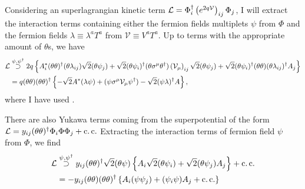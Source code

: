 \documentclass[../main.tex]{subfiles}
\begin{document}
Considering an superlagrangian kinetic term \(\mathcal{L} = \Phi^\dagger_i
\left(e^{2q \mathcal{V}}\right)_{ij} \Phi_j\), I will extract the interaction
terms containing either the fermion fields multiplets \(\psi\) from \(\Phi\)
and the fermion fields \(\lambda \equiv \lambda^a T^a\) from \(\mathcal{V}
\equiv V^a T^a\). Up to terms with the appropriate amount of \(\theta\)s, we
have
\begin{align}
    \label{susy:eq:psi_kin_int}
    \nonumber
    \mathcal{L} & \stackrel{\psi, \psi^\dagger}{\supset} 2q \left\{ A^\ast_i (\theta\theta)^\dagger (\theta\lambda_{ij}) \sqrt{2} (\theta\psi_j) + \sqrt{2} (\theta\psi_i)^\dagger (\theta\sigma^\mu\theta^\dagger) \left(\mathcal{V}_\mu\right)_{ij} \sqrt{2} (\theta\psi_j) + \sqrt{2} (\theta\psi_i)^\dagger (\theta\theta) (\theta\lambda_{ij})^\dagger A_j \right\} \\
       & = q(\theta\theta)(\theta\theta)^\dagger \left\{ -\sqrt{2} A^\ast (\lambda\psi) + (\psi \sigma^\mu \mathcal{V}_\mu \psi^\dagger) - \sqrt{2} (\psi\lambda)^\dagger A \right\},
\end{align}
where I have used . 
\medskip

There are also Yukawa terms coming from the superpotential of the form \(\mathcal{L} =
y_{ij} (\theta\theta)^\dagger \Phi_i \Phi \Phi_j + \operatorname{c.c.}\) Extracting the
interaction terms of fermion field \(\psi\) from \(\Phi\), we find
\begin{align}
    \label{susy:eq:psi_yuk_int}
    \nonumber
    \mathcal{L} & \stackrel{\psi, \psi^\dagger}{\supset} y_{ij} (\theta\theta)^\dagger \sqrt{2} (\theta\psi) \left\{ A_i \sqrt{2}(\theta\psi_i) + \sqrt{2}(\theta\psi_j)A_j \right\} + \operatorname{c.c.} \\
       & = -y_{ij} (\theta\theta)(\theta\theta)^\dagger \left\{ A_i(\psi\psi_j) + (\psi_i\psi)A_j + \operatorname{c.c.} \right\}
\end{align}
\end{document}
